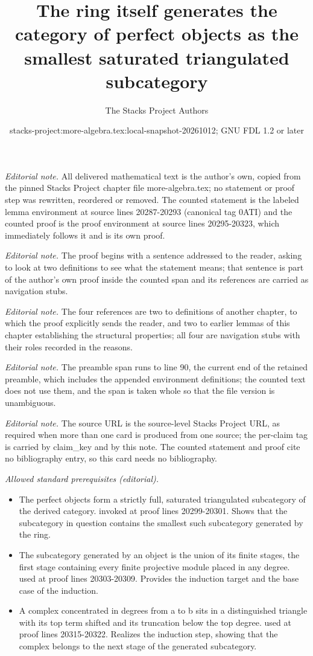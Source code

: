 \documentclass[10pt,a4paper]{amsart}
\title{The ring itself generates the category of perfect objects as the smallest saturated triangulated subcategory}
\author{The Stacks Project Authors}
\date{stacks-project:more-algebra.tex:local-snapshot-20261012; GNU FDL 1.2 or later}
\theoremstyle{plain}
\theoremstyle{definition}
\theoremstyle{remark}
\numberwithin{equation}{subsection}
\begin{document}
\maketitle
\setcounter{subsection}{1}
\noindent\textit{Editorial note.} All delivered mathematical text is the author's own, copied from the pinned Stacks Project chapter file more-algebra.tex; no statement or proof step was rewritten, reordered or removed. The counted statement is the labeled lemma environment at source lines 20287-20293 (canonical tag 0ATI) and the counted proof is the proof environment at source lines 20295-20323, which immediately follows it and is its own proof.\par\medskip
\noindent\textit{Editorial note.} The proof begins with a sentence addressed to the reader, asking to look at two definitions to see what the statement means; that sentence is part of the author's own proof inside the counted span and its references are carried as navigation stubs.\par\medskip
\noindent\textit{Editorial note.} The four references are two to definitions of another chapter, to which the proof explicitly sends the reader, and two to earlier lemmas of this chapter establishing the structural properties; all four are navigation stubs with their roles recorded in the reasons.\par\medskip
\noindent\textit{Editorial note.} The preamble span runs to line 90, the current end of the retained preamble, which includes the appended environment definitions; the counted text does not use them, and the span is taken whole so that the file version is unambiguous.\par\medskip
\noindent\textit{Editorial note.} The source URL is the source-level Stacks Project URL, as required when more than one card is produced from one source; the per-claim tag is carried by claim\_key and by this note. The counted statement and proof cite no bibliography entry, so this card needs no bibliography.\par\medskip
\noindent\textit{Allowed standard prerequisites (editorial).}\begin{itemize}
\item The perfect objects form a strictly full, saturated triangulated subcategory of the derived category. invoked at proof lines 20299-20301. Shows that the subcategory in question contains the smallest such subcategory generated by the ring.
\item The subcategory generated by an object is the union of its finite stages, the first stage containing every finite projective module placed in any degree. used at proof lines 20303-20309. Provides the induction target and the base case of the induction.
\item A complex concentrated in degrees from a to b sits in a distinguished triangle with its top term shifted and its truncation below the top degree. used at proof lines 20315-20322. Realizes the induction step, showing that the complex belongs to the next stage of the generated subcategory.
\end{itemize}\medskip
\end{document}
